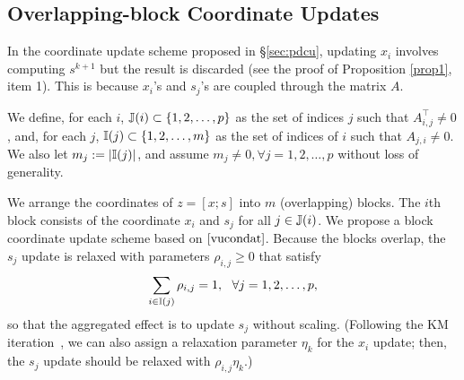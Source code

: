 {{\subsection{Overlapping-block Coordinate Updates}\label{sec:overlap}
{In the coordinate update scheme proposed in \S\ref{sec:pdcu}, updating $x_i$ involves computing $s^{k+1}$ but the result is discarded (see the proof of Proposition \ref{prop1}, item 1). This is because $x_i$'s and $s_j$'s are coupled through the matrix $A$.

We define, for each $i$,  $\mathbb{J}(i)\subset \{1,2,\ldots, p\}$ as the set of indices $ j$ such that $A^\top_{i,j}\neq 0$, and, for each $j$,  $\mathbb{I}(j)\subset\{1,2,\ldots,m\}$ as the set of indices of $i$ such that $A_{j,i}\neq 0$. We also let $m_j:=|\mathbb{I}(j)|$, and assume $m_j\neq 0,\forall j=1,2,\ldots, p$ without loss of generality.

We arrange the coordinates of $z=[x;s]$ into $m$ (overlapping) blocks. The $i$th block consists of the coordinate $x_i$ and  $s_j$ for all $j\in\mathbb{J}(i)$. We propose a block coordinate update scheme based on $\eqref{vucondat}$. Because the blocks overlap, the $s_j$ update is relaxed with parameters $\rho_{i,j}\ge 0$ that satisfy  $$\sum_{i\in \mathbb{I}(j)}\rho_{i,j}=1,~~\forall j=1,2,\ldots, p,$$ so that the aggregated effect is to update $s_j$ without scaling. (Following the
KM iteration~\cite{krasnosel1955two}, we can also assign a relaxation parameter $\eta_k$ for the $x_i$ update; then, the $s_j$ update should be relaxed with $\rho_{i,j}\eta_k$.)

}}}
